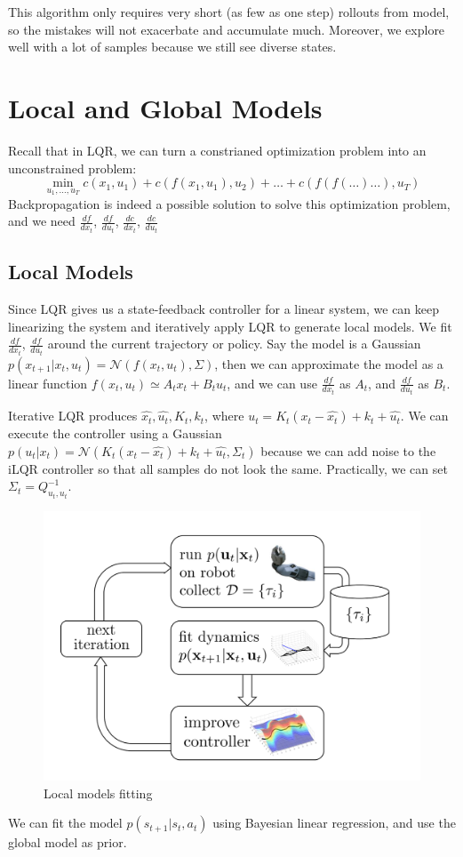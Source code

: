 This algorithm only requires very short (as few as one step) rollouts from model, so the mistakes will not exacerbate and accumulate much. Moreover, we explore well with a lot of samples because we still see diverse states. 

\section{Local and Global Models}
Recall that in LQR, we can turn a constrianed optimization problem into an unconstrained problem:
\[
\min_{u_1,\dots,u_T}c(x_1,u_1)+c(f(x_1,u_1),u_2)+\dots+c(f(f(\dots)\dots),u_T)
\]
Backpropagation is indeed a possible solution to solve this optimization problem, and we need $\frac{df}{d{x_t}}$, $\frac{df}{du_t}$, $\frac{dc}{dx_t}$, $\frac{dc}{du_t}$

\subsection{Local Models}
Since LQR gives us a state-feedback controller for a linear system, we can keep linearizing the system and iteratively apply LQR to generate local models. We fit $\frac{df}{d{x_t}}$, $\frac{df}{du_t}$ around the current trajectory or policy. Say the model is a Gaussian $p(x_{t+1}|x_t,u_t)=\mathcal{N}(f(x_t,u_t),\Sigma)$, then we can approximate the model as a linear function $f(x_t,u_t)\simeq A_t x_t+B_tu_t$, and we can use $\frac{df}{d{x_t}}$ as $A_t$, and $\frac{df}{du_t}$ as $B_t$.

Iterative LQR produces $\hat{x_t},\hat{u_t},K_t,k_t$, where $u_t = K_t(x_t-\hat{x_t})+k_t+\hat{u_t}$. We can execute the controller using a Gaussian $p(u_t|x_t) = \mathcal{N}(K_t(x_t-\hat{x_t})+k_t+\hat{u_t},\Sigma_t)$ because we can add noise to the iLQR controller so that all samples do not look the same. Practically, we can set $\Sigma_t = Q^{-1}_{u_t,u_t}$.
\begin{figure}
    \centering
    \includegraphics[scale=0.35]{figures/localmodel.png}
    \caption{Local models fitting}
    \label{fig:localmodel}
\end{figure}
We can fit the model $p(s_{t+1}|s_t,a_t)$ using Bayesian linear regression, and use the global model as prior.

